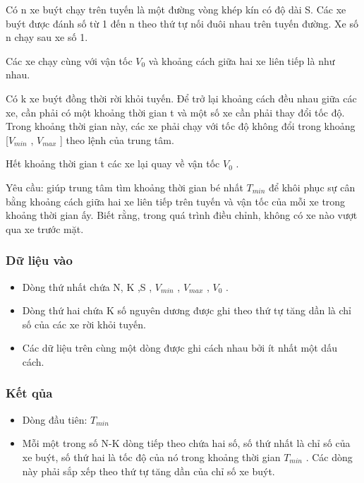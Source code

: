 



   Có n xe buýt chạy trên tuyến là một đường vòng khép kín có độ dài S. Các xe buýt được đánh số từ 1 đến n theo thứ tự nối đuôi nhau trên tuyến đường. Xe số n chạy sau xe số 1.  

   Các xe chạy cùng với vận tốc $V_{0}$   và khoảng cách giữa hai xe liên tiếp là như nhau.  

   Có k xe buýt đồng thời rời khỏi tuyến. Để trở lại khoảng cách đều nhau giữa các xe, cần phải có một khoảng thời gian t và một số xe cần phải thay   đổi tốc độ. Trong khoảng thời gian này, các xe phải chạy với tốc độ không đổi trong khoảng [$V_{min}$   , $V_{max}$   ] theo lệnh của   trung tâm.  

   Hết khoảng thời gian t các xe lại quay về vận tốc $V_{0}$   .  

   Yêu cầu: giúp trung tâm tìm khoảng thời gian bé nhất $T_{min}$   để khôi phục sự cân bằng khoảng cách giữa hai xe liên tiếp trên tuyến và   vận tốc của mỗi xe trong khoảng thời gian ấy. Biết rằng, trong quá trình điều chỉnh, không có xe nào vượt qua xe trước mặt.  

\subsubsection{   Dữ liệu vào  }
\begin{itemize}
	\item     Dòng thứ nhất chứa N, K ,S , $V_{min}$    , $V_{max}$    , $V_{0}$    .   
	\item     Dòng thứ hai chứa K số nguyên dương được ghi theo thứ tự tăng dần là chỉ số của các xe rời khỏi tuyến.   
	\item     Các dữ liệu trên cùng một dòng được ghi cách nhau bởi ít nhất một dấu cách.   
\end{itemize}

\subsubsection{   Kết qủa  }
\begin{itemize}
	\item     Dòng đầu tiên: $T_{min}$
	\item     Mỗi một trong số N-K dòng tiếp theo chứa hai số, số thứ nhất là chỉ số của xe buýt, số thứ hai là tốc độ của nó trong khoảng thời gian   $T_{min}$    . Các dòng này phải sắp xếp theo thứ tự tăng dần của chỉ số xe buýt.   
\end{itemize}

